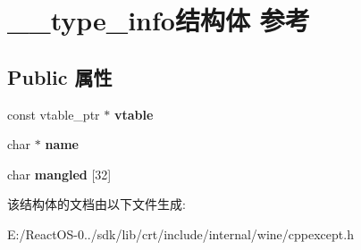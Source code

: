 \hypertarget{struct____type__info}{}\section{\+\_\+\+\_\+type\+\_\+info结构体 参考}
\label{struct____type__info}
\subsection*{Public 属性}
\begin{DoxyCompactItemize}
\item 
\mbox{\label{struct____type__info_a0630b809e23339052efac79d89fb1b35}} 
const vtable\+\_\+ptr $\ast$ {\bfseries vtable}
\item 
\mbox{\label{struct____type__info_a70739d7fe315e5f4076e99d6db242eb4}} 
char $\ast$ {\bfseries name}
\item 
\mbox{\label{struct____type__info_a2c0460807c3d45a2a47a1f1c21ebcb6b}} 
char {\bfseries mangled} \mbox{[}32\mbox{]}
\end{DoxyCompactItemize}


该结构体的文档由以下文件生成\+:\begin{DoxyCompactItemize}
\item 
E\+:/\+React\+O\+S-\/0../sdk/lib/crt/include/internal/wine/cppexcept.\+h\end{DoxyCompactItemize}
